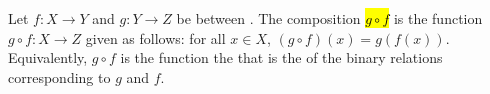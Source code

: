 \begin{definition} \label{definition:composition_of_functions_between_sets}
    Let $f: X \to Y$ and $g: Y \to Z$ be  between . 
    The composition \hl{$g \circ f$} is the function $g \circ f: X \to Z$ given as follows: for all $x \in X$, $(g \circ f)(x) = g(f(x))$.
    Equivalently, $g \circ f$ is the function  the  that is the  of the binary relations corresponding to $g$ and $f$.
\end{definition}